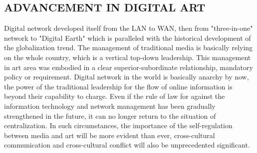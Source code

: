 \subsection{ADVANCEMENT IN DIGITAL ART}
Digital network developed itself from the LAN to WAN, then from "three-in-one" network to "Digital Earth" which is paralleled with the historical development of the globalization trend. The management of traditional media is basically relying on the whole country, which is a vertical top-down leadership. This management in art area was embodied in a clear superior-subordinate relationship, mandatory policy or requirement. Digital network in the world is basically anarchy by now, the power of the traditional leadership for the flow of online information is beyond their capability to charge. Even if the rule of law for against the information technology and network management has been gradually strengthened in the future, it can no longer return to the situation of centralization. In such circumstances, the importance of the self-regulation between media and art will be more evident than ever, cross-cultural communication and cross-cultural conflict will also be unprecedented significant.


